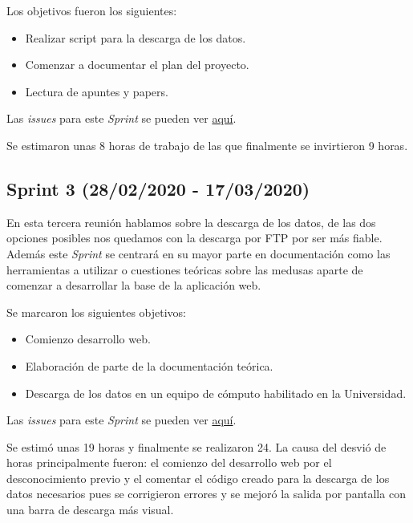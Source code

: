 Los objetivos fueron los siguientes:

\begin{itemize}
\item Realizar script para la descarga de los datos.
\item Comenzar a documentar el plan del proyecto.
\item Lectura de apuntes y papers.
\end{itemize}

Las \emph{issues} para este \emph{Sprint} se pueden ver \href{https://github.com/psnti/TFG-Pablo-Santidrian-Tudanca/milestone/2}{aquí}.

Se estimaron unas 8 horas de trabajo de las que finalmente se invirtieron 9 horas.


\subsection{Sprint 3 (28/02/2020 - 17/03/2020)}\label{Sprint-3}

En esta tercera reunión hablamos sobre la descarga de los datos, de las dos opciones posibles nos quedamos con la descarga por FTP por ser más fiable. Además este \emph{Sprint} se centrará en su mayor parte en documentación como las herramientas a utilizar o cuestiones teóricas sobre las medusas aparte de comenzar a desarrollar la base de la aplicación web.

Se marcaron los siguientes objetivos:
\begin{itemize}
\item Comienzo desarrollo web.
\item Elaboración de parte de la documentación teórica.
\item Descarga de los datos en un equipo de cómputo habilitado en la Universidad.
\end{itemize}

Las \emph{issues} para este \emph{Sprint} se pueden ver \href{https://github.com/psnti/TFG-Pablo-Santidrian-Tudanca/milestone/3}{aquí}.

Se estimó unas 19 horas y finalmente se realizaron 24. La causa del desvió de horas principalmente fueron: el comienzo del desarrollo web por el desconocimiento previo y el comentar el código creado para la descarga de los datos necesarios pues se corrigieron errores y se mejoró la salida por pantalla con una barra de descarga más visual.


